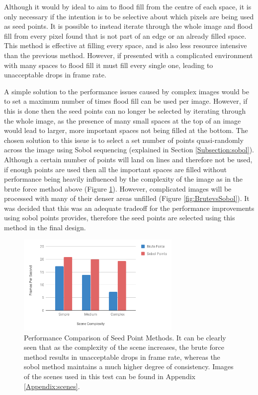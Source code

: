 Although it would by ideal to aim to flood fill from the centre of each space, it is only necessary if the intention is to be selective about which pixels are being used as seed points. It is possible to instead iterate through the whole image and flood fill from every pixel found that is not part of an edge or an already filled space. This method is effective at filling every space, and is also less resource intensive than the previous method. However, if presented with a complicated environment with many spaces to flood fill it must fill every single one, leading to unacceptable drops in frame rate.

A simple solution to the performance issues caused by complex images would be to set a maximum number of times flood fill can be used per image. However, if this is done then the seed points can no longer be selected by iterating through the whole image, as the presence of many small spaces at the top of an image would lead to larger, more important spaces not being filled at the bottom. The chosen solution to this issue is to select a set number of points quasi-randomly across the image using Sobol sequencing (explained in Section \ref{Subsection:sobol}). Although a certain number of points will land on lines and therefore not be used, if enough points are used then all the important spaces are filled without performance being heavily influenced by the complexity of the image as in the brute force method above (Figure \ref{fig:fpscomp}). However, complicated images will be processed with many of their denser areas unfilled (Figure \ref{fig:BrutevsSobol}). It was decided that this was an adequate tradeoff for the performance improvements using sobol points provides, therefore the seed points are selected using this method in the final design.

\begin{figure}[H]
    \begin{center}
      \includegraphics[width=0.7\textwidth]{Figures/FPSComp.png}
      \caption[Performance Comparison of Seed Point Methods]{Performance Comparison of Seed Point Methods. It can be clearly seen that as the complexity of the scene increases, the brute force method results in unacceptable drops in frame rate, whereas the sobol method maintains a much higher degree of consistency. Images of the scenes used in this test can be found in Appendix \ref{Appendix:scenes}.}
      \label{fig:fpscomp}
    \end{center}
\end{figure}

